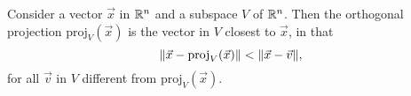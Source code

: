 \documentclass[a4paper,8pt]{article}
\begin{document}
\begin{outline}
    Consider a vector \(\vec{x}\) in \(\mathbb{R}^n\) and a subspace \(V\) of \(\mathbb{R}^n\). Then the orthogonal projection \(\text{proj}_V(\vec{x})\) is the
    vector in \(V\) closest to \(\vec{x}\), in that
    \[ \|\vec{x} - \text{proj}_V(\vec{x})\| < \|\vec{x}-\vec{v}\|\text{,} \]
    for all \(\vec{v}\) in \(V\) different from \(\text{proj}_V(\vec{x})\).
\end{outline}
\end{document}
